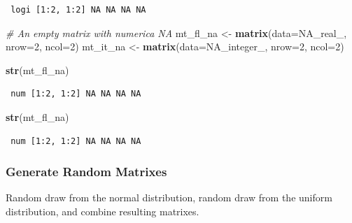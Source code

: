 \documentclass[
]{book}
\newenvironment{Shaded}{\begin{snugshade}}{\end{snugshade}}
\newcommand{\CommentTok}[1]{\textcolor[rgb]{0.56,0.35,0.01}{\textit{#1}}}
\newcommand{\DataTypeTok}[1]{\textcolor[rgb]{0.13,0.29,0.53}{#1}}
\newcommand{\DecValTok}[1]{\textcolor[rgb]{0.00,0.00,0.81}{#1}}
\newcommand{\KeywordTok}[1]{\textcolor[rgb]{0.13,0.29,0.53}{\textbf{#1}}}
\newcommand{\NormalTok}[1]{#1}
\newcommand{\OtherTok}[1]{\textcolor[rgb]{0.56,0.35,0.01}{#1}}
\newcommand{\StringTok}[1]{\textcolor[rgb]{0.31,0.60,0.02}{#1}}
\begin{document}
\begin{verbatim}
 logi [1:2, 1:2] NA NA NA NA
\end{verbatim}

\begin{Shaded}
\begin{Highlighting}[]
\CommentTok{# An empty matrix with numerica NA}
\NormalTok{mt_fl_na <-}\StringTok{ }\KeywordTok{matrix}\NormalTok{(}\DataTypeTok{data=}\OtherTok{NA_real_}\NormalTok{, }\DataTypeTok{nrow=}\DecValTok{2}\NormalTok{, }\DataTypeTok{ncol=}\DecValTok{2}\NormalTok{)}
\NormalTok{mt_it_na <-}\StringTok{ }\KeywordTok{matrix}\NormalTok{(}\DataTypeTok{data=}\OtherTok{NA_integer_}\NormalTok{, }\DataTypeTok{nrow=}\DecValTok{2}\NormalTok{, }\DataTypeTok{ncol=}\DecValTok{2}\NormalTok{)}

\KeywordTok{str}\NormalTok{(mt_fl_na)}
\end{Highlighting}
\end{Shaded}

\begin{verbatim}
 num [1:2, 1:2] NA NA NA NA
\end{verbatim}

\begin{Shaded}
\begin{Highlighting}[]
\KeywordTok{str}\NormalTok{(mt_fl_na)}
\end{Highlighting}
\end{Shaded}

\begin{verbatim}
 num [1:2, 1:2] NA NA NA NA
\end{verbatim}

\hypertarget{generate-random-matrixes}{%
\subsubsection{Generate Random Matrixes}\label{generate-random-matrixes}}

Random draw from the normal distribution, random draw from the uniform distribution, and combine resulting matrixes.
\end{document}

